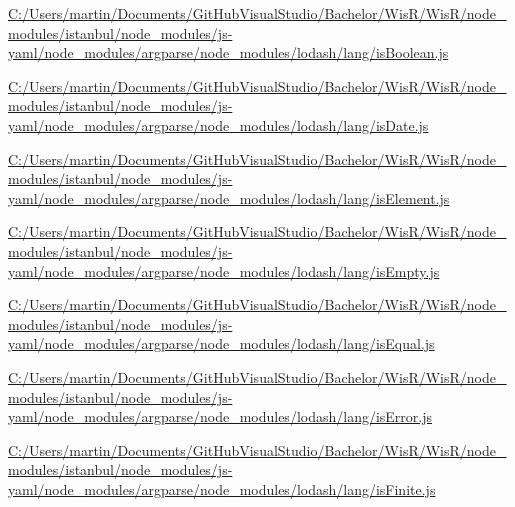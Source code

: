 \begin{DoxyCompactItemize}
\item 
\hyperlink{_c_1_2_users_2martin_2_documents_2_git_hub_visual_studio_2_bachelor_2_wis_r_2_wis_r_2node_module4c02a065899017c79db2f6aaa4d5e42c}{C\+:/\+Users/martin/\+Documents/\+Git\+Hub\+Visual\+Studio/\+Bachelor/\+Wis\+R/\+Wis\+R/node\+\_\+modules/istanbul/node\+\_\+modules/js-\/yaml/node\+\_\+modules/argparse/node\+\_\+modules/lodash/lang/is\+Boolean.\+js}
\item 
\hyperlink{_c_1_2_users_2martin_2_documents_2_git_hub_visual_studio_2_bachelor_2_wis_r_2_wis_r_2node_modulefb1760eee96286700e85153db54409df}{C\+:/\+Users/martin/\+Documents/\+Git\+Hub\+Visual\+Studio/\+Bachelor/\+Wis\+R/\+Wis\+R/node\+\_\+modules/istanbul/node\+\_\+modules/js-\/yaml/node\+\_\+modules/argparse/node\+\_\+modules/lodash/lang/is\+Date.\+js}
\item 
\hyperlink{_c_1_2_users_2martin_2_documents_2_git_hub_visual_studio_2_bachelor_2_wis_r_2_wis_r_2node_module51d53fd4833215a35ce65f37e207e0df}{C\+:/\+Users/martin/\+Documents/\+Git\+Hub\+Visual\+Studio/\+Bachelor/\+Wis\+R/\+Wis\+R/node\+\_\+modules/istanbul/node\+\_\+modules/js-\/yaml/node\+\_\+modules/argparse/node\+\_\+modules/lodash/lang/is\+Element.\+js}
\item 
\hyperlink{_c_1_2_users_2martin_2_documents_2_git_hub_visual_studio_2_bachelor_2_wis_r_2_wis_r_2node_moduleb1eb0222e2e40ab7ee6dcf8533a13248}{C\+:/\+Users/martin/\+Documents/\+Git\+Hub\+Visual\+Studio/\+Bachelor/\+Wis\+R/\+Wis\+R/node\+\_\+modules/istanbul/node\+\_\+modules/js-\/yaml/node\+\_\+modules/argparse/node\+\_\+modules/lodash/lang/is\+Empty.\+js}
\item 
\hyperlink{_c_1_2_users_2martin_2_documents_2_git_hub_visual_studio_2_bachelor_2_wis_r_2_wis_r_2node_module138f7216aea26d7b458aa968f5ca14f5}{C\+:/\+Users/martin/\+Documents/\+Git\+Hub\+Visual\+Studio/\+Bachelor/\+Wis\+R/\+Wis\+R/node\+\_\+modules/istanbul/node\+\_\+modules/js-\/yaml/node\+\_\+modules/argparse/node\+\_\+modules/lodash/lang/is\+Equal.\+js}
\item 
\hyperlink{_c_1_2_users_2martin_2_documents_2_git_hub_visual_studio_2_bachelor_2_wis_r_2_wis_r_2node_moduleff515ee7e02bc3930d6e69b08dedfba1}{C\+:/\+Users/martin/\+Documents/\+Git\+Hub\+Visual\+Studio/\+Bachelor/\+Wis\+R/\+Wis\+R/node\+\_\+modules/istanbul/node\+\_\+modules/js-\/yaml/node\+\_\+modules/argparse/node\+\_\+modules/lodash/lang/is\+Error.\+js}
\item 
\hyperlink{_c_1_2_users_2martin_2_documents_2_git_hub_visual_studio_2_bachelor_2_wis_r_2_wis_r_2node_module60dd093a380e591d3d57a7c84c3c4b76}{C\+:/\+Users/martin/\+Documents/\+Git\+Hub\+Visual\+Studio/\+Bachelor/\+Wis\+R/\+Wis\+R/node\+\_\+modules/istanbul/node\+\_\+modules/js-\/yaml/node\+\_\+modules/argparse/node\+\_\+modules/lodash/lang/is\+Finite.\+js}

\end{DoxyCompactItemize}
